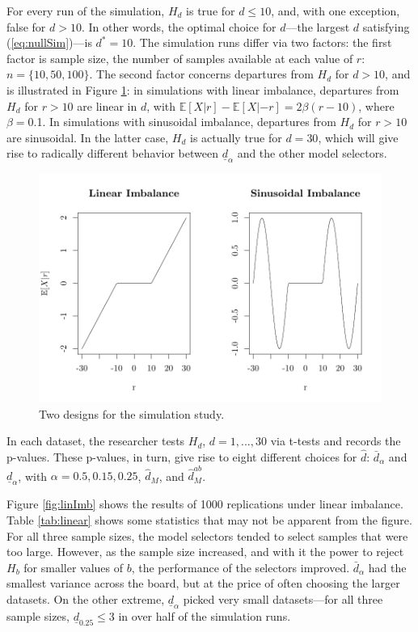 \documentclass[sts]{imsart}\usepackage[]{graphicx}\usepackage[]{color}
\makeatletter
\def\maxwidth{ %
  \ifdim\Gin@nat@width>\linewidth
    \linewidth
  \else
    \Gin@nat@width
  \fi
}
\newcommand{\dalphaU}{\bar{d}_\alpha}
\newcommand{\dalphaB}{\underline{d}_\alpha}
\newcommand{\dstar}{d^*}
\newcommand{\dhatB}{\underline{d}}
\newcommand{\dhatm}{\hat{d}_M}
\newcommand{\dhatmab}{\hat{d}^{ab}_M}
\newcommand{\EE}{\mathbb{E}}
\makeatother
\begin{document}
For every run of the simulation, $H_d$ is true for $d\le 10$, and,
with one exception, false for $d>10$.
In other words, the optimal choice for $d$---the largest $d$
satisfying (\ref{eq:nullSim})---is $\dstar=10$.
The simulation runs differ via two factors: the first factor is sample
size, the number of samples available at each value of $r$:
$n=\{10,50,100\}$.
The second factor concerns departures from $H_d$ for $d>10$, and is
illustrated in Figure \ref{fig:illustrateSim}: in simulations with
linear imbalance, departures from $H_d$ for $r>10$ are linear in $d$, with $\EE
[X|r]-\EE[X|-r]=2\beta(r-10)$, where $\beta=$0.1.
In simulations with sinusoidal imbalance, departures from $H_d$ for
$r>10$ are sinusoidal.
In the latter case, $H_d$ is actually true for $d=30$, which will give
rise to radically different behavior between $\dalphaB$ and the other
model selectors.
\begin{figure}

\includegraphics[width=\maxwidth]{figure/illlustrateSim-1} 

\caption{Two designs for the simulation study.}
\label{fig:illustrateSim}
\end{figure}

In each dataset, the researcher tests $H_d$, $d=1,...,30$ via t-tests
and records the p-values.
These p-values, in turn, give rise to eight different choices for
$\hat{d}$: $\dalphaU$ and $\dalphaB$, with $\alpha=0.5,0.15,0.25$,
$\dhatm$, and $\dhatmab$.

Figure \ref{fig:linImb} shows the results of 1000 replications
under linear imbalance.
Table \ref{tab:linear} shows some statistics that may not be apparent
from the figure.
For all three sample sizes, the model selectors tended to select
samples that were too large.
However, as the sample size increased, and with it the power to reject
$H_b$ for smaller values of $b$, the performance of the selectors
improved.
$\dalphaU$ had the smallest
variance across the board, but at the
price of often choosing the larger datasets.
On the other extreme, $\dalphaB$ picked very small datasets---for all
three sample sizes, $\dhatB_{0.25}\le 3$ in over half of the
simulation runs.
\end{document}
